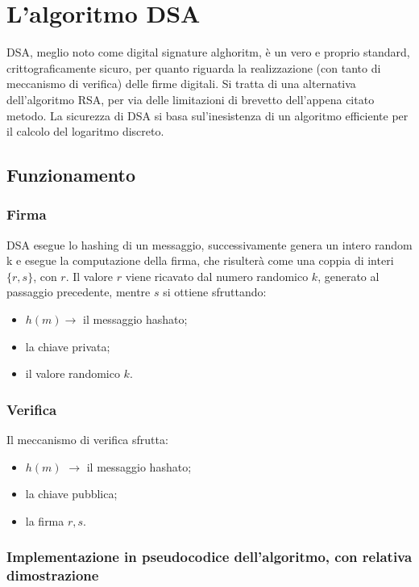\chapter{L'algoritmo DSA}

DSA, meglio noto come digital signature alghoritm, è un vero e proprio standard, crittograficamente sicuro, per quanto riguarda la realizzazione (con tanto di meccanismo di verifica) delle firme digitali. Si tratta di una alternativa dell'algoritmo RSA, per via delle limitazioni di brevetto dell'appena citato metodo. La sicurezza di DSA si basa sul'inesistenza di un algoritmo efficiente per il calcolo del logaritmo discreto.

\section{Funzionamento}

\subsection{Firma}
DSA esegue lo hashing di un messaggio, successivamente genera un intero random k e esegue la computazione della firma, che risulterà come una coppia di interi $\{r, s\}$, con $r$. Il valore $r$ viene ricavato dal numero randomico $k$, generato al passaggio precedente, mentre $s$ si ottiene sfruttando: 
\begin{itemize}
	\item $h(m) \rightarrow$ il messaggio hashato;
	\item la chiave privata;
	\item il valore randomico $k$.
\end{itemize} 

\subsection{Verifica}

Il meccanismo di verifica sfrutta:
\begin{itemize}
	\item $h(m)$ $\rightarrow$ il messaggio hashato;
	\item la chiave pubblica;
	\item la firma ${r, s}$.
\end{itemize}

\newpage

\subsection{Implementazione in pseudocodice dell'algoritmo, con relativa dimostrazione}

